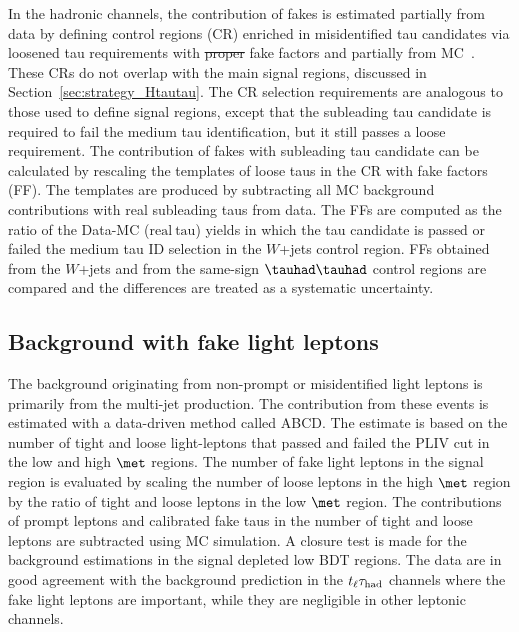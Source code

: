 \documentclass[PAPER, coverpage, atlasdraft=true, texlive=2016, UKenglish]{\ATLASLATEXPATH atlasdoc}
\providecommand{\DIFdel}[1]{{\protect\color{red}\sout{#1}}}                      %
\providecommand{\DIFdelbegin}{} %
\providecommand{\DIFdelend}{} %
\begin{document}
In the hadronic channels, the contribution of fakes is estimated partially from data by defining control regions (CR)
enriched in misidentified
tau candidates via loosened tau requirements with \DIFdelbegin \DIFdel{proper }\DIFdelend fake factors and partially from MC~\cite{ATLAS-CONF-2021-044}.
These CRs do not overlap with the main signal regions, discussed in Section~\ref{sec:strategy_Htautau}.
The CR selection requirements are analogous to those used to define signal regions, except
that the subleading tau candidate is required to fail the medium tau identification, but it still passes a loose requirement.
The contribution of fakes with subleading tau candidate can be calculated by rescaling the templates of loose taus in the CR
with fake factors (FF).
The templates are produced by subtracting all MC background contributions with real subleading taus from data.
The FFs are computed as
the ratio of the Data-MC ($\mathrm{real~tau}$) yields in which the tau candidate is passed or failed the medium tau ID selection
in the $W$+jets control region.
FFs obtained from the $W$+jets and from the same-sign $\thadhad$ control regions are compared and the differences are treated as a systematic uncertainty.

\subsection{Background with fake light leptons}
The background originating from non-prompt or misidentified light leptons is primarily from the multi-jet production.
The contribution from these events is estimated with a data-driven method called ABCD.
The estimate is based on the number of tight and loose light-leptons that passed and failed the PLIV cut in the low and high $\met$ regions. The number of
fake light leptons in the signal region is evaluated by scaling the number of loose leptons in the high $\met$ region by the ratio of tight and loose leptons in the
low $\met$ region. The contributions of prompt leptons and calibrated fake taus in the number of tight and loose leptons are subtracted using MC simulation.
A closure test is made for the background estimations in the signal depleted low BDT regions. The data are in good agreement with the background prediction in the
$t_{\ell}\tau_{\mathrm{had}}$ channels where the fake light leptons are important, while they are negligible in other leptonic channels. 
\end{document}
